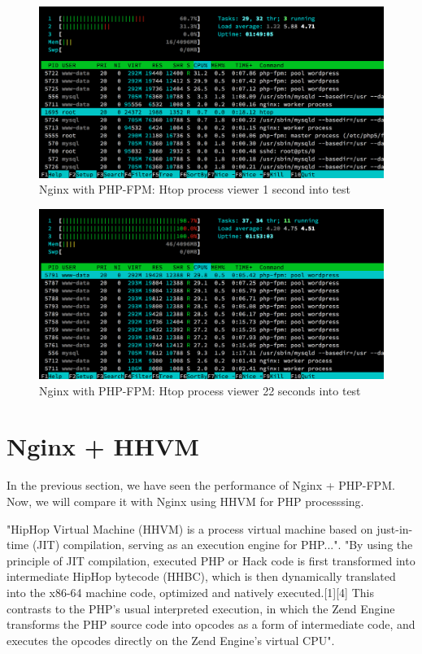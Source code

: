 \begin{figure}[H]
\begin{center}
\includegraphics[scale=0.5]{figures/Nginx_PHP-FPM_1s.png}
\caption{Nginx with PHP-FPM: Htop process viewer 1 second into test}
\label{fig:nginx_php-fpm_1s}
\end{center}
\end{figure}

\begin{figure}[H]
\begin{center}
\includegraphics[scale=0.5]{figures/Nginx_PHP-FPM_22s.png}
\caption{Nginx with PHP-FPM: Htop process viewer 22 seconds into test}
\label{fig:nginx_php-fpm_22s}
\end{center}
\end{figure}

\section{Nginx + HHVM}

In the previous section, we have seen the performance of Nginx + PHP-FPM. Now, we will compare it with Nginx using HHVM for PHP processsing.

"HipHop Virtual Machine (HHVM) is a process virtual machine based on just-in-time (JIT) compilation, serving as an execution engine for PHP...". "By using the principle of JIT compilation, executed PHP or Hack code is first transformed into intermediate HipHop bytecode (HHBC), which is then dynamically translated into the x86-64 machine code, optimized and natively executed.[1][4] This contrasts to the PHP's usual interpreted execution, in which the Zend Engine transforms the PHP source code into opcodes as a form of intermediate code, and executes the opcodes directly on the Zend Engine's virtual CPU".

